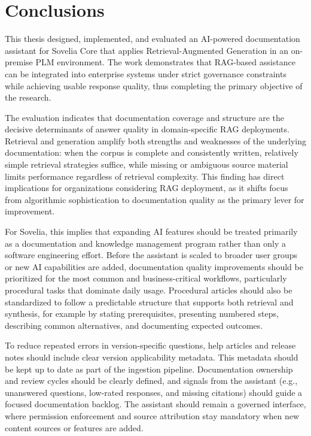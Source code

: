 \chapter{Conclusions}
\label{ch:conclusions}

This thesis designed, implemented, and evaluated an AI-powered documentation assistant for Sovelia Core that applies Retrieval-Augmented Generation in an on-premise PLM environment. The work demonstrates that RAG-based assistance can be integrated into enterprise systems under strict governance constraints while achieving usable response quality, thus completing the primary objective of the research.

The evaluation indicates that documentation coverage and structure are the decisive determinants of answer quality in domain-specific RAG deployments. Retrieval and generation amplify both strengths and weaknesses of the underlying documentation: when the corpus is complete and consistently written, relatively simple retrieval strategies suffice, while missing or ambiguous source material limits performance regardless of retrieval complexity. This finding has direct implications for organizations considering RAG deployment, as it shifts focus from algorithmic sophistication to documentation quality as the primary lever for improvement.

For Sovelia, this implies that expanding AI features should be treated primarily as a documentation and knowledge management program rather than only a software engineering effort. Before the assistant is scaled to broader user groups or new AI capabilities are added, documentation quality improvements should be prioritized for the most common and business-critical workflows, particularly procedural tasks that dominate daily usage. Procedural articles should also be standardized to follow a predictable structure that supports both retrieval and synthesis, for example by stating prerequisites, presenting numbered steps, describing common alternatives, and documenting expected outcomes.

To reduce repeated errors in version-specific questions, help articles and release notes should include clear version applicability metadata. This metadata should be kept up to date as part of the ingestion pipeline. Documentation ownership and review cycles should be clearly defined, and signals from the assistant (e.g., unanswered questions, low-rated responses, and missing citations) should guide a focused documentation backlog. The assistant should remain a governed interface, where permission enforcement and source attribution stay mandatory when new content sources or features are added.

